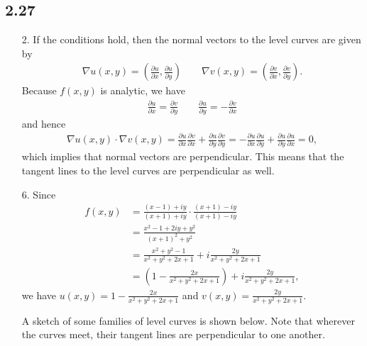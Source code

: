 \documentclass[a4paper,12pt]{article}
\begin{document}
\subsection*{2.27}
\begin{enumerate}
    \item[2.]
        If the conditions hold, then the normal vectors to the level curves are given by
        \begin{align*}
            \nabla u(x, y) = \left( \frac{\partial u}{\partial x}, \frac{\partial u}{\partial y} \right) \qquad
            \nabla v(x, y) = \left( \frac{\partial v}{\partial x}, \frac{\partial v}{\partial y} \right).
        \end{align*}
        Because $f(x, y)$ is analytic, we have
        \begin{align*}
            \frac{\partial u}{\partial x} = \frac{\partial v}{\partial y} \qquad
            \frac{\partial u}{\partial y} = -\frac{\partial v}{\partial x}
        \end{align*}
        and hence
        \begin{align*}
            \nabla u(x, y) \cdot \nabla v(x, y) = \frac{\partial u}{\partial x} \frac{\partial v}{\partial x} + \frac{\partial u}{\partial y} \frac{\partial v}{\partial y} = -\frac{\partial u}{\partial x} \frac{\partial u}{\partial y} + \frac{\partial u}{\partial y} \frac{\partial u}{\partial x} = 0,
        \end{align*}
        which implies that normal vectors are perpendicular. This means that the tangent lines to the level curves are perpendicular as well.

    \item[6.]
        Since
        \begin{align*}
            f(x, y) &= \frac{(x - 1) + iy}{(x + 1) + iy} \cdot \frac{(x + 1) - iy}{(x + 1) - iy} \\
            &= \frac{x^2 - 1 + 2iy + y^2}{(x + 1)^2 + y^2} \\
            &= \frac{x^2 + y^2 - 1}{x^2 + y^2 + 2x + 1} + i\frac{2y}{x^2 + y^2 + 2x + 1} \\
            &= \left( 1 - \frac{2x}{x^2 + y^2 + 2x + 1} \right) + i\frac{2y}{x^2 + y^2 + 2x + 1},
        \end{align*}
        we have $u(x, y) = 1 - \frac{2x}{x^2 + y^2 + 2x + 1}$ and $v(x, y) = \frac{2y}{x^2 + y^2 + 2x + 1}$. \par
        A sketch of some families of level curves is shown below. Note that wherever the curves meet, their tangent lines are perpendicular to one another.
        \vspace{5cm}
\end{enumerate}
\end{document}

